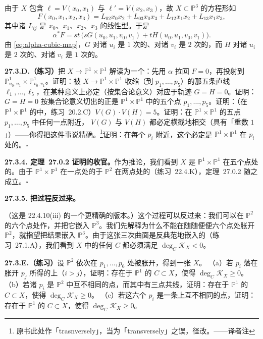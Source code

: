 由于 $X$ 包含 $\ell=V(x_0,x_1)$ 与 $\ell'=V(x_2,x_3)$，故 $X\subset\mathbb{P}^3$ 的方程形如
\[
F(x_0,x_1,x_2,x_3)=L_{02}x_0x_2+L_{03}x_0x_3+L_{12}x_1x_2+L_{13}x_1x_3,
\]
其中诸 $L_{ij}$ 是 $x_0$、$x_1$、$x_2$、$x_3$ 的线性型。于是
\[
\alpha^*F=st\,\bigl(sG(u_0,u_1,v_0,v_1)+tH(u_0,u_1,v_0,v_1)\bigr).
\]
由 \eqref{eq:alpha-cubic-map}，$G$ 对诸 $u_i$ 是 $1$ 次的、对诸 $v_i$ 是 $2$ 次的，而 $H$ 对诸 $u_i$ 是 $2$ 次的、对诸 $v_i$ 是 $1$ 次的。

\textbf{27.3.D.（练习）}\quad 把\trMorphism{} $X\to\mathbb{P}^1\times\mathbb{P}^1$ 解读为一个\trRationalMap{}：先用 $\alpha$ 拉回 $F=0$，再投射到 $\mathbb{P}^1_{u_0,u_1}\times\mathbb{P}^1_{v_0,v_1}$。证明：被 $X\to\mathbb{P}^1\times\mathbb{P}^1$ 收缩（到 $p_1,\dots,p_5$）的那五条直线 $\ell_1,\dots,\ell_5$，在某种意义上必定（按集合论意义）对应于轨迹 $G=H=0$。证明：$G=H=0$ 按集合论意义切出的正是 $\mathbb{P}^1\times\mathbb{P}^1$ 中的五个点 $p_1,\dots,p_5$。证明：（在 $\mathbb{P}^1\times\mathbb{P}^1$ 的\trIntersectionTheory{}中，\mbox{练习~20.2.C}）$V(G)\cdot V(H)=5$。证明：在 $\mathbb{P}^1\times\mathbb{P}^1$ 的五点 $p_1,\dots,p_5$ 中任何一点附近，\trEffectiveCartierDivisor{} $V(G)$ 与 $V(H)$ 都必定横截地相交（具有「重数 $1$」）——你得把这件事说精确。\footnote{原书此处作「trasnversely」，当为「transversely」之误，径改。——译者注}证明：在每个 $p_i$ 附近，这个\trProjection{}必定是 $\mathbb{P}^1\times\mathbb{P}^1$ 在 $p_i$ 处的\trBlowup{}。\hfill$\square$

\textbf{27.3.4. \mbox{定理~27.0.2} 证明的收官。}\quad 作为推论，我们看到 $X$ 是 $\mathbb{P}^1\times\mathbb{P}^1$ 在五个点处的\trBlowup{}。由于 $\mathbb{P}^1\times\mathbb{P}^1$ 在一点处的\trBlowup{}\trIsomorphic{}于 $\mathbb{P}^2$ 在两点处的\trBlowup{}（\mbox{练习~22.4.K}），\mbox{定理~27.0.2} 随之成立。\hfill$\square$

\textbf{27.3.5. 把过程反过来。}

（这是 \mbox{22.4.10(iii)} 的一个更精确的版本。）这个过程可以反过来：我们可以在 $\mathbb{P}^2$ 的六个点处作\trBlowup{}，并把它嵌入 $\mathbb{P}^3$。我们先解释为什么不能在随随便便六个点处胀开 $\mathbb{P}^2$，就指望把结果嵌入 $\mathbb{P}^3$。由于这张三次曲面是反典范地嵌入的（\mbox{练习~27.1.A}），我们看到 $X$ 中的任何\trCurve{} $C$ 都必须满足 $\deg_C\mathscr{K}_X<0$。

\textbf{27.3.E.（练习）}\quad 设 $\mathbb{P}^2$ 依次在 $p_1,\dots,p_6$ 处被胀开，得到一张\trSmooth{}\trSurface{} $X$。
（a）若 $p_i$ 落在胀开 $p_j$ 所得的\trExceptionalDivisor{}上（$i>j$），证明：存在\trIsomorphic{}于 $\mathbb{P}^1$ 的\trCurve{} $C\subset X$，使得 $\deg_C\mathscr{K}_X\ge 0$。
（b）若诸 $p_i$ 是 $\mathbb{P}^2$ 中互不相同的点，而其中有三点共线，证明：存在\trIsomorphic{}于 $\mathbb{P}^1$ 的\trCurve{} $C\subset X$，使得 $\deg_C\mathscr{K}_X\ge 0$。
（c）若这六个 $p_i$ 是一条\trSmooth{}\trConic{}上互不相同的点，证明：存在\trIsomorphic{}于 $\mathbb{P}^1$ 的\trCurve{} $C\subset X$，使得 $\deg_C\mathscr{K}_X\ge 0$。

